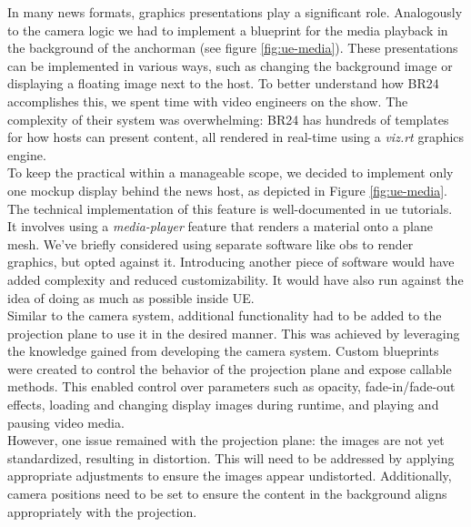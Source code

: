 \documentclass[
  a4paper,  %
  twoside,  %
  bibliography=totoc,
  headsepline,
  cleardoublepage=empty,
  parskip=half,
  draft=false
]{scrbook}
\begin{document}
In many news formats, graphics presentations play a significant role. Analogously to the camera logic we had to implement a blueprint for the media playback in the background of the anchorman (see figure \ref{fig:ue-media}). These presentations can be implemented in various ways, such as changing the background image or displaying a floating image next to the host. To better understand how BR24 accomplishes this, we spent time with video engineers on the show. The complexity of their system was overwhelming: BR24 has hundreds of templates for how hosts can present content, all rendered in real-time using a \textit{viz.rt} graphics engine. \\
To keep the practical within a manageable scope, we decided to implement only one mockup display behind the news host, as depicted in Figure \ref{fig:ue-media}. The technical implementation of this feature is well-documented in \gls{ue} tutorials. It involves using a \textit{media-player} feature that renders a material onto a plane mesh.
We've briefly considered using separate software like \gls{obs} to render graphics, but opted against it. Introducing another piece of software would have added complexity and reduced customizability. It would have also run against the idea of doing as much as possible inside UE. \\
Similar to the camera system, additional functionality had to be added to the projection plane to use it in the desired manner. This was achieved by leveraging the knowledge gained from developing the camera system. Custom blueprints were created to control the behavior of the projection plane and expose callable methods. This enabled control over parameters such as opacity, fade-in/fade-out effects, loading and changing display images during runtime, and playing and pausing video media. \\
However, one issue remained with the projection plane: the images are not yet standardized, resulting in distortion. This will need to be addressed by applying appropriate adjustments to ensure the images appear undistorted. Additionally, camera positions need to be set to ensure the content in the background aligns appropriately with the projection.
\end{document}
